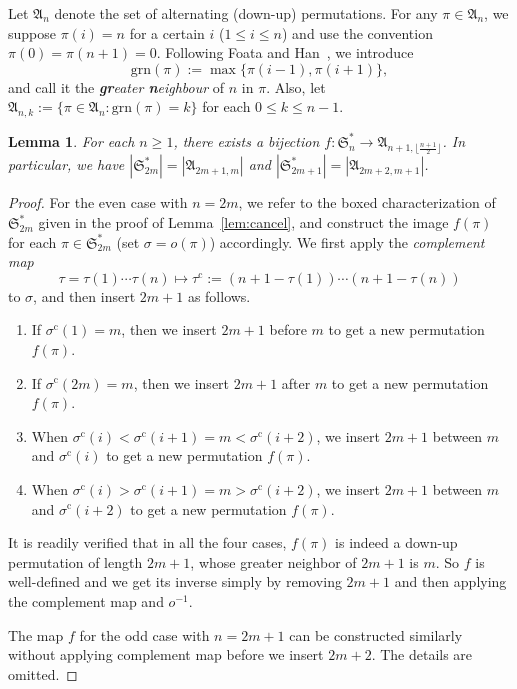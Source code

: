 \documentclass[11pt,reqno]{amsart}
\numberwithin{equation}{section}
\theoremstyle{plain}
\newtheorem{lemma}[theorem]{Lemma}
\theoremstyle{definition}
\renewcommand{\S}{\mathfrak{S}}
\def\A{\mathfrak{A}}
\def\grn{\mathrm{grn}}
\begin{document}
Let $\A_n$ denote the set of alternating (down-up) permutations. For any $\pi\in\A_n$, we suppose $\pi(i)=n$ for a certain $i$ ($1\le i\le n$) and use the convention $\pi(0)=\pi(n+1)=0$. Following Foata and Han~\cite{FH}, we introduce
$$\grn(\pi):=\max\{\pi(i-1),\pi(i+1)\},$$
and call it the {\it \textbf{gr}eater \textbf{n}eighbour} of $n$ in $\pi$. Also, let $\A_{n,k}:=\{\pi\in\A_n:\grn(\pi)=k\}$ for each $0\le k\le n-1$.

\begin{lemma}\label{lem:bij to Poupard}
For each $n\ge 1$, there exists a bijection $f:\S_{n}^*\to\A_{n+1,\lfloor\frac{n+1}{2}\rfloor}$. In particular, we have $|\S_{2m}^*|=|\A_{2m+1,m}|$ and $|\S_{2m+1}^*|=|\A_{2m+2,m+1}|$.
\end{lemma}
\begin{proof}
For the even case with $n=2m$, we refer to the boxed characterization of $\S_{2m}^*$ given in the proof of Lemma~\ref{lem:cancel}, and construct the image $f(\pi)$ for each $\pi\in\S_{2m}^*$ (set $\sigma=o(\pi)$) accordingly. We first apply the {\it complement map}
\begin{equation}\label{def:comp}
\tau=\tau(1)\cdots\tau(n)\mapsto \tau^{\mathrm{c}}:=(n+1-\tau(1))\cdots(n+1-\tau(n))
\end{equation}
 to $\sigma$, and then insert $2m+1$ as follows.
\begin{enumerate}[(e1)]
  \item If $\sigma^{\mathrm{c}}(1)=m$, then we insert $2m+1$ before $m$ to get a new permutation $f(\pi)$.
  \item If $\sigma^{\mathrm{c}}(2m)=m$, then we insert $2m+1$ after $m$ to get a new permutation $f(\pi)$.
  \item When $\sigma^{\mathrm{c}}(i)<\sigma^{\mathrm{c}}(i+1)=m<\sigma^{\mathrm{c}}(i+2)$, we insert $2m+1$ between $m$ and $\sigma^{\mathrm{c}}(i)$ to get a new permutation $f(\pi)$.
  \item When $\sigma^{\mathrm{c}}(i)>\sigma^{\mathrm{c}}(i+1)=m>\sigma^{\mathrm{c}}(i+2)$, we insert $2m+1$ between $m$ and $\sigma^{\mathrm{c}}(i+2)$ to get a new permutation $f(\pi)$.
\end{enumerate}
It is readily verified that in all the four cases, $f(\pi)$ is indeed a down-up permutation of length $2m+1$, whose greater neighbor of $2m+1$ is $m$. So $f$ is well-defined and we get its inverse  simply by removing $2m+1$ and then applying the complement map and $o^{-1}$.

The map $f$ for the odd case with $n=2m+1$ can be constructed similarly without applying complement map before we insert $2m+2$. The details are omitted.
\end{proof}
\end{document}
